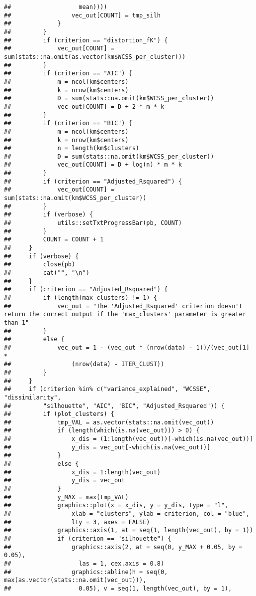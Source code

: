 \documentclass[
]{article}
\begin{document}
\begin{verbatim}
##                   mean))))
##                 vec_out[COUNT] = tmp_silh
##             }
##         }
##         if (criterion == "distortion_fK") {
##             vec_out[COUNT] = sum(stats::na.omit(as.vector(km$WCSS_per_cluster)))
##         }
##         if (criterion == "AIC") {
##             m = ncol(km$centers)
##             k = nrow(km$centers)
##             D = sum(stats::na.omit(km$WCSS_per_cluster))
##             vec_out[COUNT] = D + 2 * m * k
##         }
##         if (criterion == "BIC") {
##             m = ncol(km$centers)
##             k = nrow(km$centers)
##             n = length(km$clusters)
##             D = sum(stats::na.omit(km$WCSS_per_cluster))
##             vec_out[COUNT] = D + log(n) * m * k
##         }
##         if (criterion == "Adjusted_Rsquared") {
##             vec_out[COUNT] = sum(stats::na.omit(km$WCSS_per_cluster))
##         }
##         if (verbose) {
##             utils::setTxtProgressBar(pb, COUNT)
##         }
##         COUNT = COUNT + 1
##     }
##     if (verbose) {
##         close(pb)
##         cat("", "\n")
##     }
##     if (criterion == "Adjusted_Rsquared") {
##         if (length(max_clusters) != 1) {
##             vec_out = "The 'Adjusted_Rsquared' criterion doesn't return the correct output if the 'max_clusters' parameter is greater than 1"
##         }
##         else {
##             vec_out = 1 - (vec_out * (nrow(data) - 1))/(vec_out[1] * 
##                 (nrow(data) - ITER_CLUST))
##         }
##     }
##     if (criterion %in% c("variance_explained", "WCSSE", "dissimilarity", 
##         "silhouette", "AIC", "BIC", "Adjusted_Rsquared")) {
##         if (plot_clusters) {
##             tmp_VAL = as.vector(stats::na.omit(vec_out))
##             if (length(which(is.na(vec_out))) > 0) {
##                 x_dis = (1:length(vec_out))[-which(is.na(vec_out))]
##                 y_dis = vec_out[-which(is.na(vec_out))]
##             }
##             else {
##                 x_dis = 1:length(vec_out)
##                 y_dis = vec_out
##             }
##             y_MAX = max(tmp_VAL)
##             graphics::plot(x = x_dis, y = y_dis, type = "l", 
##                 xlab = "clusters", ylab = criterion, col = "blue", 
##                 lty = 3, axes = FALSE)
##             graphics::axis(1, at = seq(1, length(vec_out), by = 1))
##             if (criterion == "silhouette") {
##                 graphics::axis(2, at = seq(0, y_MAX + 0.05, by = 0.05), 
##                   las = 1, cex.axis = 0.8)
##                 graphics::abline(h = seq(0, max(as.vector(stats::na.omit(vec_out))), 
##                   0.05), v = seq(1, length(vec_out), by = 1), 

\end{verbatim}
\end{document}
